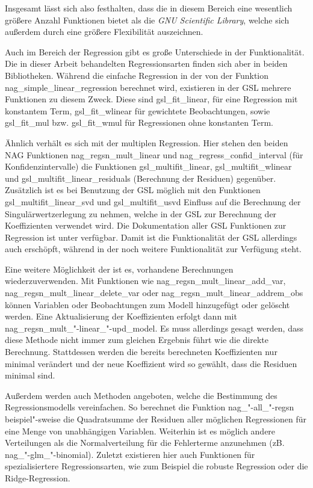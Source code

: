 Insgesamt lässt sich also festhalten, dass die \naglib in diesem Bereich eine wesentlich größere Anzahl Funktionen bietet als die {\it GNU Scientific Library}, welche sich außerdem durch eine größere Flexibilität auszeichnen.

Auch im Bereich der Regression gibt es große Unterschiede in der Funktionalität.
Die in dieser Arbeit behandelten Regressionsarten finden sich aber in beiden Bibliotheken.
Während die einfache Regression in der \naglib von der Funktion nag\_simple\_linear\_regression berechnet wird, existieren in der GSL mehrere Funktionen zu diesem Zweck.
Diese sind gsl\_fit\_linear, für eine Regression mit konstantem Term, gsl\_fit\_wlinear für gewichtete Beobachtungen, sowie gsl\_fit\_mul bzw. gsl\_fit\_wmul für Regressionen ohne konstanten Term.

Ähnlich verhält es sich mit der multiplen Regression.
Hier stehen den beiden NAG Funktionen nag\_regsn\_mult\_linear und nag\_regress\_confid\_interval (für Konfidenzintervalle) die Funktionen  gsl\_multifit\_linear, gsl\_multifit\_wlinear und gsl\_multifit\_linear\_residuals (Berechnung der Residuen) gegenüber.
Zusätzlich ist es bei Benutzung der GSL möglich mit den Funktionen gsl\_multifit\_linear\_svd und gsl\_multifit\_usvd Einfluss auf die Berechnung der Singulärwertzerlegung zu nehmen, welche in der GSL zur Berechnung der Koeffizienten verwendet wird.
Die Dokumentation aller GSL Funktionen zur Regression ist unter \cite{FreeSoftwareFoundation2011} verfügbar.
Damit ist die Funktionalität der GSL allerdings auch erschöpft, während in der \naglib noch weitere Funktionalität zur Verfügung steht.

Eine weitere Möglichkeit der \naglib ist es, vorhandene Berechnungen wiederzuverwenden.
Mit Funktionen wie nag\_regsn\_mult\_linear\_add\_var, nag\_regsn\_mult\_linear\_delete\_var oder nag\_regsn\_mult\_linear\_addrem\_obs können Variablen oder Beobachtungen zum Modell hinzugefügt oder gelöscht werden.
Eine Aktualisierung der Koeffizienten erfolgt dann mit nag\_regsn\_mult\_"-linear\_"-upd\_model.
Es muss allerdings gesagt werden, dass diese Methode nicht immer zum gleichen Ergebnis führt wie die direkte Berechnung.
Stattdessen werden die bereits berechneten Koeffizienten nur minimal verändert und der neue Koeffizient wird so gewählt, dass die Residuen minimal sind. 

Außerdem werden auch Methoden angeboten, welche die Bestimmung des Regressionsmodells vereinfachen.
So berechnet die Funktion nag\_"-all\_"-regsn beispiel"-sweise die Quadratsumme der Residuen aller möglichen Regressionen für eine Menge von unabhängigen Variablen.
Weiterhin ist es möglich andere Verteilungen als die Normalverteilung für die Fehlerterme anzunehmen (zB. nag\_"-glm\_"-binomial).
Zuletzt existieren hier auch Funktionen für spezialisiertere Regressionsarten, wie zum Beispiel die robuste Regression oder die Ridge-Regression.

